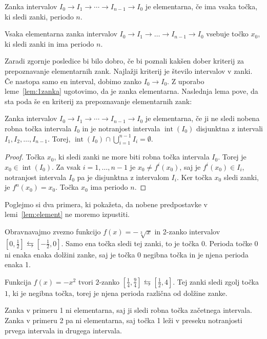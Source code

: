 \documentclass[mat2]{fmfdelo}
\DeclareMathOperator{\interior}{int}
\begin{document}
\begin{definicija}\label{def:element}
Zanka intervalov $I_0 \to I_1 \to \cdots \to I_{n-1} \to I_0$ je elementarna, če ima vsaka točka, ki sledi zanki, periodo $n$.
\end{definicija}

\begin{posledica}
Vsaka elementarna zanka intervalov $I_0 \to I_1 \to \dots \to I_{n-1} \to I_0$ vsebuje točko $x_0$, ki sledi zanki in ima periodo $n$.
\end{posledica}

Zaradi zgornje posledice bi bilo dobro, če bi poznali kakšen dober kriterij za prepoznavanje elementarnih zank. Najlažji kriterij je število intervalov v zanki. Če nastopa samo en interval, dobimo zanko $I_0 \to I_0$. Z uporabo leme~\ref{lem:1zanka} ugotovimo, da je zanka elementarna. Naslednja lema pove, da sta  poda še en kriterij za prepoznavanje elementarnih zank:

\begin{lema}\label{lem:element}
Zanka intervalov $I_0 \to I_1 \to \cdots \to I_{n-1} \to I_0$ je elementarna, če ji ne sledi nobena robna točka intervala $I_0$ in je notranjost intervala $\interior(I_0)$ disjunktna z intervali $I_1, I_2,  \dots, I_{n-1}$. Torej, $\interior(I_0) \cap \bigcup_{i=1}^{n-1}I_i = \emptyset$.
\end{lema}
\begin{proof}
Točka $x_0$, ki sledi zanki ne more biti robna točka intervala $I_0$. Torej je $x_0 \in \interior(I_0)$. Za vsak $i=1, \dots, n-1$ je $x_0 \neq f^i(x_0)$, saj je $f^i(x_0) \in I_i$, notranjost intervala $I_0$ pa je disjunktna z intervalom $I_i$. Ker točka $x_0$ sledi zanki, je $f^n(x_0)=x_0$. Točka $x_0$ ima periodo $n$.
\end{proof}

Poglejmo si dva primera, ki pokažeta, da nobene predpostavke v lemi~\ref{lem:element} ne moremo izpustiti.

\begin{primer}
Obravnavajmo zvezno funkcijo $f(x) = -\sqrt[3]{x}$ in 2-zanko intervalov $[0, \frac{1}{2}] \leftrightarrows [-\frac{1}{2}, 0]$. Samo ena točka sledi tej zanki, to je točka 0. Perioda točke 0 ni enaka enaka dolžini zanke, saj je točka 0 negibna točka in je njena perioda enaka 1.
\end{primer}
\begin{primer}
Funkcija $f(x) = - x^2$ tvori $2$-zanko $[\frac{1}{4}, \frac{9}{4}] \leftrightarrows [\frac{1}{2}, 4]$. Tej zanki sledi zgolj točka $1$, ki je negibna točka, torej je njena perioda različna od dolžine zanke.
\end{primer}
Zanka v primeru 1 ni elementarna, saj ji sledi robna točka začetnega intervala. Zanka v primeru 2 pa ni elementarna, saj točka 1 leži v preseku notranjosti prvega intervala in drugega intervala. 
\end{document}
